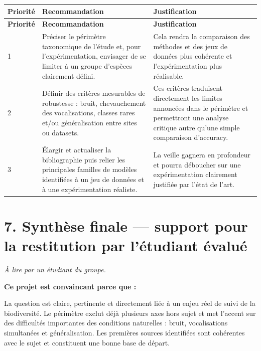\documentclass[11pt,a4paper]{article}
\begin{document}
\small
\setlength{\tabcolsep}{5pt}
\begin{longtable}{@{}>{\centering\arraybackslash}p{1.50cm}
                        >{\raggedright\arraybackslash}p{6.80cm}
                        >{\raggedright\arraybackslash}p{7.00cm}@{}}
\toprule
\textbf{Priorité} & \textbf{Recommandation} & \textbf{Justification} \\
\midrule
\endfirsthead
\toprule
\textbf{Priorité} & \textbf{Recommandation} & \textbf{Justification} \\
\midrule
\endhead

1
& Préciser le périmètre taxonomique de l'étude et, pour l'expérimentation, envisager de se limiter à un groupe d'espèces clairement défini.
& Cela rendra la comparaison des méthodes et des jeux de données plus cohérente et l'expérimentation plus réalisable. \\
\addlinespace[0.45em]

2
& Définir des critères mesurables de robustesse : bruit, chevauchement des vocalisations, classes rares et/ou généralisation entre sites ou datasets.
& Ces critères traduisent directement les limites annoncées dans le périmètre et permettront une analyse critique autre qu'une simple comparaison d'accuracy. \\
\addlinespace[0.45em]

3
& Élargir et actualiser la bibliographie puis relier les principales familles de modèles identifiées à un jeu de données et à une expérimentation réaliste.
& La veille gagnera en profondeur et pourra déboucher sur une expérimentation clairement justifiée par l'état de l'art. \\

\bottomrule
\end{longtable}
\setlength{\tabcolsep}{6pt}
\normalsize

\section*{7. Synthèse finale --- support pour la restitution par l'étudiant évalué}

\textit{À lire par un étudiant du groupe.}

\textbf{Ce projet est convaincant parce que :}

La question est claire, pertinente et directement liée à un enjeu réel de suivi de la biodiversité. Le périmètre exclut déjà plusieurs axes hors sujet et met l'accent sur des difficultés importantes des conditions naturelles : bruit, vocalisations simultanées et généralisation. Les premières sources identifiées sont cohérentes avec le sujet et constituent une bonne base de départ.
\end{document}
